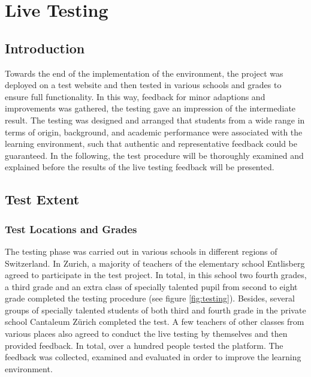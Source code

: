 \chapter{Live Testing}
\label{chapter:testing}

\section{Introduction}
\label{section:introduction}
Towards the end of the implementation of the environment, the project was deployed on a test website and then tested in various schools and grades to ensure full functionality. In this way, feedback for minor adaptions and improvements was gathered, the testing gave an impression of the intermediate result. The testing was designed and arranged that students from a wide range in terms of origin, background, and academic performance were associated with the learning environment, such that authentic and representative feedback could be guaranteed. In the following, the test procedure will be thoroughly examined and explained before the results of the live testing feedback will be presented.

\section{Test Extent}
\label{section:procedure}

\subsection{Test Locations and Grades}
The testing phase was carried out in various schools in different regions of Switzerland. In Zurich, a majority of teachers of the elementary school Entlisberg agreed to participate in the test project. In total, in this school two fourth grades, a third grade and an extra class of specially talented pupil from second to eight grade completed the testing procedure (see figure \ref{fig:testing}). Besides, several groups of specially talented students of both third and fourth grade in the private school Cantaleum Zürich completed the test. A few teachers of other classes from various places also agreed to conduct the live testing by themselves and then provided feedback. In total, over a hundred people tested the platform. The feedback was collected, examined and evaluated in order to improve the learning environment. 

